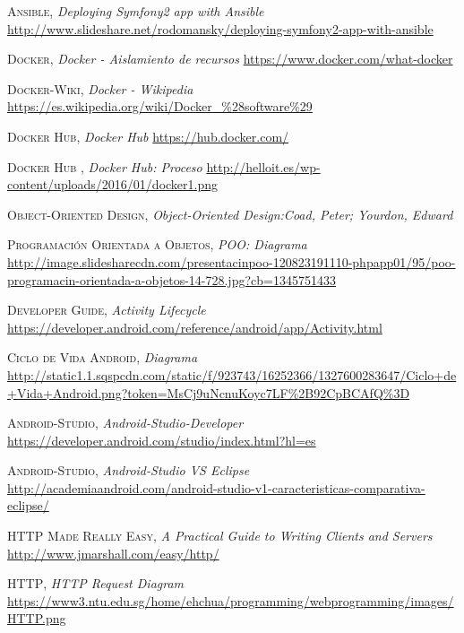 \documentclass[a4paper,11pt]{book}
\begin{document}
\begin{thebibliography}{aaaa}
 \textsc{Ansible},
\textit{Deploying Symfony2 app with Ansible}
\url{http://www.slideshare.net/rodomansky/deploying-symfony2-app-with-ansible} 


 \textsc{Docker},
\textit{Docker - Aislamiento de recursos}
\url{https://www.docker.com/what-docker} 

 \textsc{Docker-Wiki},
\textit{Docker - Wikipedia}
\url{https://es.wikipedia.org/wiki/Docker_\%28software\%29} 


 \textsc{Docker Hub},
\textit{Docker Hub}
\url{https://hub.docker.com/} 

 \textsc{Docker Hub },
\textit{Docker Hub: Proceso}
\url{http://helloit.es/wp-content/uploads/2016/01/docker1.png}









 \textsc{Object-Oriented Design},
\textit{Object-Oriented Design:Coad, Peter; Yourdon, Edward }
\url{} 

 \textsc{Programación Orientada a Objetos},
\textit{POO: Diagrama }
\url{http://image.slidesharecdn.com/presentacinpoo-120823191110-phpapp01/95/poo-programacin-orientada-a-objetos-14-728.jpg?cb=1345751433} 

 \textsc{Developer Guide},
\textit{Activity Lifecycle }
\url{https://developer.android.com/reference/android/app/Activity.html} 


 \textsc{Ciclo de Vida Android},
\textit{Diagrama}
\url{http://static1.1.sqspcdn.com/static/f/923743/16252366/1327600283647/Ciclo+de+Vida+Android.png?token=MsCj9uNcnuKoyc7LF%2B92CpBCAfQ%3D} 

 \textsc{Android-Studio},
\textit{Android-Studio-Developer}
\url{https://developer.android.com/studio/index.html?hl=es} 

 \textsc{Android-Studio},
\textit{Android-Studio VS Eclipse}
\url{http://academiaandroid.com/android-studio-v1-caracteristicas-comparativa-eclipse/} 


 \textsc{HTTP Made Really Easy},
\textit{A Practical Guide to Writing Clients and Servers}
\url{http://www.jmarshall.com/easy/http/} 


 \textsc{HTTP},
\textit{HTTP Request Diagram}
\url{https://www3.ntu.edu.sg/home/ehchua/programming/webprogramming/images/HTTP.png} 



\end{thebibliography}
\end{document}
